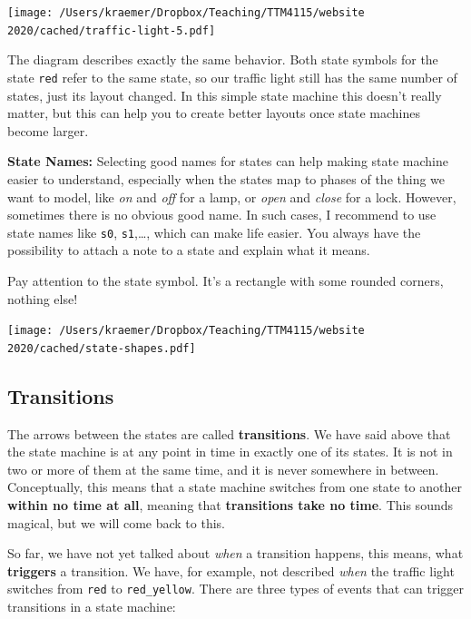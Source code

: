 \documentclass[10pt, twoside, twocolumn]{book}
\let\origfigure=\figure
\let\endorigfigure=\endfigure
\renewenvironment{figure}[1][]{%
  \origfigure[H]
}{%
  \endorigfigure
}
\begin{document}
\begin{figure}[htbp]
\begin{center}
\texttt{[image: /Users/kraemer/Dropbox/Teaching/TTM4115/website 2020/cached/traffic-light-5.pdf]}%
\label{default}
\end{center}
\end{figure}
The diagram describes exactly the same behavior. Both state symbols for
the state \texttt{red} refer to the same state, so our traffic light
still has the same number of states, just its layout changed. In this
simple state machine this doesn't really matter, but this can help you
to create better layouts once state machines become larger.

\textbf{State Names:} Selecting good names for states can help making
state machine easier to understand, especially when the states map to
phases of the thing we want to model, like \emph{on} and \emph{off} for
a lamp, or \emph{open} and \emph{close} for a lock. However, sometimes
there is no obvious good name. In such cases, I recommend to use state
names like \texttt{s0}, \texttt{s1},\ldots, which can make life easier.
You always have the possibility to attach a note to a state and explain
what it means.

Pay attention to the state symbol. It's a rectangle with some rounded
corners, nothing else!

\begin{figure}[htbp]
\begin{center}
\texttt{[image: /Users/kraemer/Dropbox/Teaching/TTM4115/website 2020/cached/state-shapes.pdf]}%
\label{default}
\end{center}
\end{figure}
\hypertarget{transitions}{%
\subsection{Transitions}\label{transitions}}

The arrows between the states are called \textbf{transitions}. We have
said above that the state machine is at any point in time in exactly one
of its states. It is not in two or more of them at the same time, and it
is never somewhere in between. Conceptually, this means that a state
machine switches from one state to another \textbf{within no time at
all}, meaning that \textbf{transitions take no time}. This sounds
magical, but we will come back to this.

So far, we have not yet talked about \emph{when} a transition happens,
this means, what \textbf{triggers} a transition. We have, for example,
not described \emph{when} the traffic light switches from \texttt{red}
to \texttt{red\_yellow}. There are three types of events that can
trigger transitions in a state machine:
\end{document}
